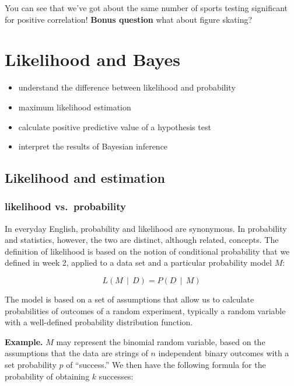 \documentclass[
  letterpaper,
  DIV=11,
  numbers=noendperiod]{scrreprt}
\providecommand{\tightlist}{%
  \setlength{\itemsep}{0pt}\setlength{\parskip}{0pt}}\usepackage{longtable,booktabs,array}
\begin{document}
You can see that we've got about the same number of sports testing
significant for positive correlation! \textbf{Bonus question} what about
figure skating?


\hypertarget{likelihood-and-bayes}{%
\chapter{Likelihood and Bayes}\label{likelihood-and-bayes}}

\begin{itemize}
\tightlist
\item
  understand the difference between likelihood and probability
\item
  maximum likelihood estimation
\item
  calculate positive predictive value of a hypothesis test
\item
  interpret the results of Bayesian inference
\end{itemize}

\hypertarget{likelihood-and-estimation}{%
\section{Likelihood and estimation}\label{likelihood-and-estimation}}

\hypertarget{likelihood-vs.-probability}{%
\subsection{likelihood
vs.~probability}\label{likelihood-vs.-probability}}

In everyday English, probability and likelihood are synonymous. In
probability and statistics, however, the two are distinct, although
related, concepts. The definition of likelihood is based on the notion
of conditional probability that we defined in week 2, applied to a data
set and a particular probability model \(M\):

\[ 
L(M \ \ \vert \ \ D) = P(D \ \ \vert \ \ M)
\]

The model is based on a set of assumptions that allow us to calculate
probabilities of outcomes of a random experiment, typically a random
variable with a well-defined probability distribution function.

\textbf{Example.} \(M\) may represent the binomial random variable,
based on the assumptions that the data are strings of \(n\) independent
binary outcomes with a set probability \(p\) of ``success.'' We then
have the following formula for the probability of obtaining \(k\)
successes:
\end{document}
